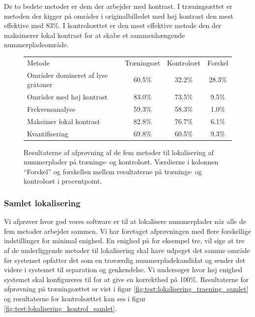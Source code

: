 De to bedste metoder er dem der arbejder med kontrast. I træningsættet er metoden der kigger på områder i originalbilledet med høj kontrast den mest effektive med 83\%. I kontrolsættet er den mest effektive metode den der maksimerer lokal kontrast for at skabe et sammenhængende nummerpladeområde. 

\begin{figure}[htp]
\centering
\begin{tabular}{|l|c|c|c|}
\hline
\rowcolor[gray]{0.9} \multicolumn{4}{|>{\columncolor[gray]{0.9}}c|}{\textbf{Individuelle metoder til lokalisering}} \\ \hline
Metode & Træningsæt & Kontrolsæt & Forskel \\ \hline
Områder domineret af lyse gråtoner & 60.5\% & 32.2\% & 28.3\% \\ \hline
Områder med høj kontrast           & 83.0\% & 73.5\% &  9.5\% \\ \hline
Frekvensanalyse                    & 59.3\% & 58.3\% &  1.0\% \\ \hline
Maksimer lokal kontrast            & 82.8\% & 76.7\% &  6.1\% \\ \hline
Kvantifisering                     & 69.8\% & 60.5\% &  9.3\% \\ \hline
\end{tabular}
\caption{Resultaterne af afprøvning af de fem metoder til lokalisering af nummerplader på trænings- og kontrolsæt. Værdierne i kolonnen ``Forskel'' og forskellen mellem resultaterne på trænings- og kontrolsæt i procentpoint.}
\label{fig:test:lokalisering_traening_kontrol}
\end{figure}


\subsubsection{Samlet lokalisering}
Vi afprøver hvor god vores software er til at lokalisere nummerplader når alle de fem metoder arbejder sammen. Vi har foretaget afprøvningen med flere forskellige indstillinger for minimal enighed. En enighed på for eksempel tre, vil sige at tre af de underliggende metoder til lokalisering skal have udpeget det samme område før systemet opfatter det som en troværdig nummerpladekandidat og sender det videre i systemet til separation og genkendelse. Vi undersøger hvor høj enighed systemet skal konfigureres til for at give en korrekthed på 100\%. Resultaterne for afprøvning på træningsættet er vist i figur \vref{fig:test:lokalisering_traening_samlet} og resultaterne for kontrolsættet kan ses i figur \vref{fig:test:lokalisering_kontrol_samlet}.

